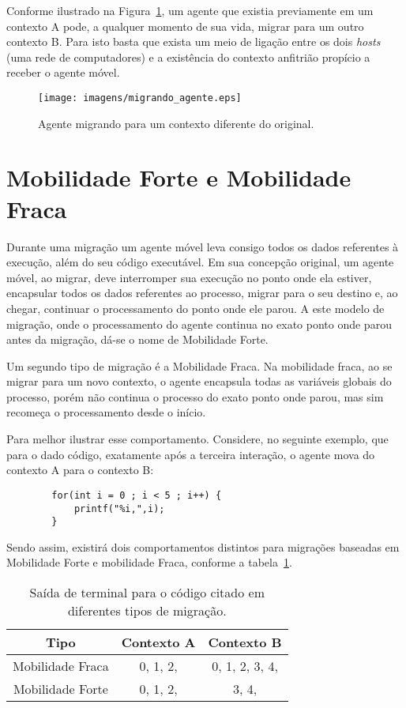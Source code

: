	Conforme ilustrado na Figura~\ref{fig:migrando_agente}, um agente que existia previamente em um contexto A pode, a qualquer momento de sua vida, migrar para um outro contexto B. Para isto basta que exista um meio de ligação entre os dois \textit{hosts} (uma rede de computadores) e a existência do contexto anfitrião propício a receber o agente móvel.

\begin{figure}[htb]
  \centering
  \centerline{\texttt{[image: imagens/migrando\_agente.eps]}}
  \caption{Agente migrando para um contexto diferente do original.}
\label{fig:migrando_agente}
\end{figure}

\section{Mobilidade Forte e Mobilidade Fraca}
	
	Durante uma migração um agente móvel leva consigo todos os dados referentes à execução, além do seu código executável. Em sua concepção original, um agente móvel, ao migrar, deve interromper sua execução no ponto onde ela estiver, encapsular todos os dados referentes ao processo, migrar para o seu destino e, ao chegar, continuar o processamento do ponto onde ele parou. A este modelo de migração, onde o processamento do agente continua no exato ponto onde parou antes da migração, dá-se o nome de Mobilidade Forte.

	Um segundo tipo de migração é a Mobilidade Fraca. Na mobilidade fraca, ao se migrar para um novo contexto, o agente encapsula todas as variáveis globais do processo, porém não continua o processo do exato ponto onde parou, mas sim recomeça o processamento desde o início.

	Para melhor ilustrar esse comportamento. Considere, no seguinte exemplo, que para o dado código, exatamente após a terceira interação, o agente mova do contexto A para o contexto B:
\begin{table}
\lstset{language=C}
\begin{lstlisting}
		for(int i = 0 ; i < 5 ; i++) {
			printf("%i,",i);
		}
\end{lstlisting}
	
\end{table}


	Sendo assim, existirá dois comportamentos distintos para migrações baseadas em Mobilidade Forte e mobilidade Fraca, conforme a tabela~\ref{tabela_mobilidade}.
\begin{table}
\begin{center}
	\begin{tabular}{| c | c | c |}
		\hline
		Tipo & Contexto A & Contexto B \\ \hline
		Mobilidade Fraca & 0, 1, 2, & 0, 1, 2, 3, 4, \\ \hline
		Mobilidade Forte & 0, 1, 2, & 3, 4, \\ \hline
	\end{tabular}
	\caption{Saída de terminal para o código citado em diferentes tipos de migração.}
	\label{tabela_mobilidade}
\end{center}
\end{table}

